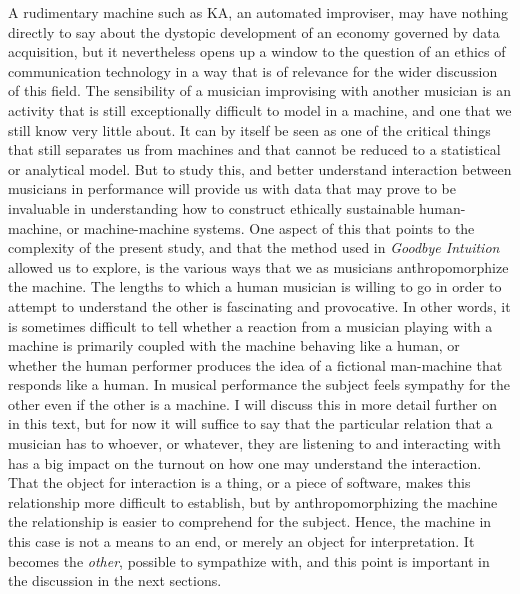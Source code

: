 \documentclass[11pt]{article}
\begin{document}
A rudimentary machine such as KA, an automated improviser, may have nothing directly to say about the dystopic development of an economy governed by data acquisition, but it nevertheless opens up a window to the question of an ethics of communication technology in a way that is of relevance for the wider discussion of this field. The sensibility of a musician improvising  with another musician is an activity that is still exceptionally difficult to model in a machine, and one that we still know very little about. It can by itself be seen as one of the critical things that still separates us from machines and that cannot be reduced to a statistical or analytical model. But to study this, and better understand interaction between musicians in performance will provide us with data that may prove to be invaluable in understanding how to construct ethically sustainable human-machine, or machine-machine systems. One aspect of this that points to the complexity of the present study, and that the method used in \emph{Goodbye Intuition} allowed us to explore, is the various ways that we as musicians anthropomorphize the machine. The lengths to which a human musician is willing to go in order to attempt to understand the other is fascinating and provocative. In other words, it is sometimes difficult to tell whether a reaction from a musician playing with a machine is primarily coupled with the machine behaving like a human, or whether the human performer produces the idea of a fictional man-machine that responds like a human. In musical performance the subject feels sympathy for the other even if the other is a machine. I will discuss this in more detail further on in this text, but for now it will suffice to say that the particular relation that a musician has to whoever, or whatever, they are listening to and interacting with has a big impact on the turnout on how one may understand the interaction. That the object for interaction is a thing, or a piece of software, makes this relationship more difficult to establish, but by anthropomorphizing the machine the relationship is easier to comprehend for the subject. Hence, the machine in this case is not a means to an end, or merely an object for interpretation. It becomes the \emph{other}, possible to sympathize with, and this point is important in the discussion in the next sections.
\end{document}
